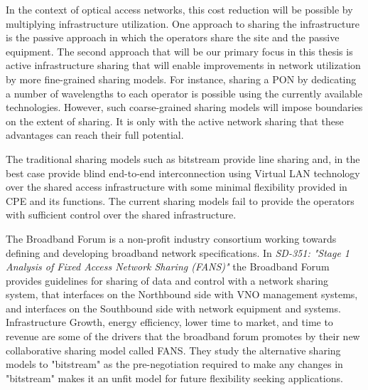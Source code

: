 In the context of optical access networks, this cost reduction will be possible by multiplying infrastructure utilization. One approach to sharing the infrastructure is the passive approach in which the operators share the site and the passive equipment. The second approach that will be our primary focus in this thesis is active infrastructure sharing that will enable improvements in network utilization by more fine-grained sharing models. For instance, sharing a \ac{PON} by dedicating a number of wavelengths to each operator is possible using the currently available technologies. However, such coarse-grained sharing models will impose boundaries on the extent of sharing. It is only with the active network sharing that these advantages can reach their full potential.

The traditional sharing models such as bitstream provide line sharing and, in the best case provide blind end-to-end interconnection using Virtual LAN technology over the shared access infrastructure with some minimal flexibility provided in \ac{CPE} and its functions. The current sharing models fail to provide the operators with sufficient control over the shared infrastructure.


The Broadband Forum is a non-profit industry consortium working towards defining and developing broadband network specifications. In \textit{SD-351: "Stage 1 Analysis of Fixed Access Network Sharing (FANS)" }\cite{bforum2015} the Broadband Forum provides guidelines for sharing of data and control with a network sharing system, that interfaces on the Northbound side with \ac{VNO} management systems, and interfaces on the Southbound side with network equipment and systems.
Infrastructure Growth, energy efficiency, lower time to market, and time to revenue are some of the drivers that the broadband forum promotes by their new collaborative sharing model called \ac{FANS}.
They study the alternative sharing models to "bitstream" as the pre-negotiation required to make any changes in "bitstream" makes it an unfit model for future flexibility seeking applications. %


